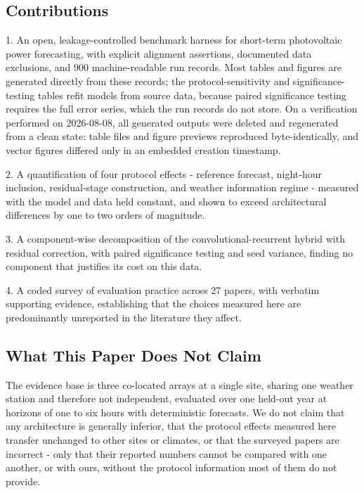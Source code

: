 \subsection{Contributions}

1. An open, leakage-controlled benchmark harness for short-term
   photovoltaic power forecasting, with explicit alignment assertions,
   documented data exclusions, and 900 machine-readable run records.
   Most tables and figures are generated directly from these records;
   the protocol-sensitivity and significance-testing tables refit models
   from source data, because paired significance testing requires the
   full error series, which the run records do not store. On a
   verification performed on 2026-08-08, all generated outputs were
   deleted and regenerated from a clean state: table files and figure
   previews reproduced byte-identically, and vector figures differed only
   in an embedded creation timestamp.

2. A quantification of four protocol effects - reference forecast,
   night-hour inclusion, residual-stage construction, and weather
   information regime - measured with the model and data held constant,
   and shown to exceed architectural differences by one to two orders of
   magnitude.

3. A component-wise decomposition of the convolutional-recurrent hybrid
   with residual correction, with paired significance testing and seed
   variance, finding no component that justifies its cost on this data.

4. A coded survey of evaluation practice across 27 papers, with verbatim
   supporting evidence, establishing that the choices measured here are
   predominantly unreported in the literature they affect.

\subsection{What This Paper Does Not Claim}

The evidence base is three co-located arrays at a single site, sharing
one weather station and therefore not independent, evaluated over one
held-out year at horizons of one to six hours with deterministic
forecasts. We do not claim that any architecture is generally inferior,
that the protocol effects measured here transfer unchanged to other
sites or climates, or that the surveyed papers are incorrect - only that
their reported numbers cannot be compared with one another, or with
ours, without the protocol information most of them do not provide.

